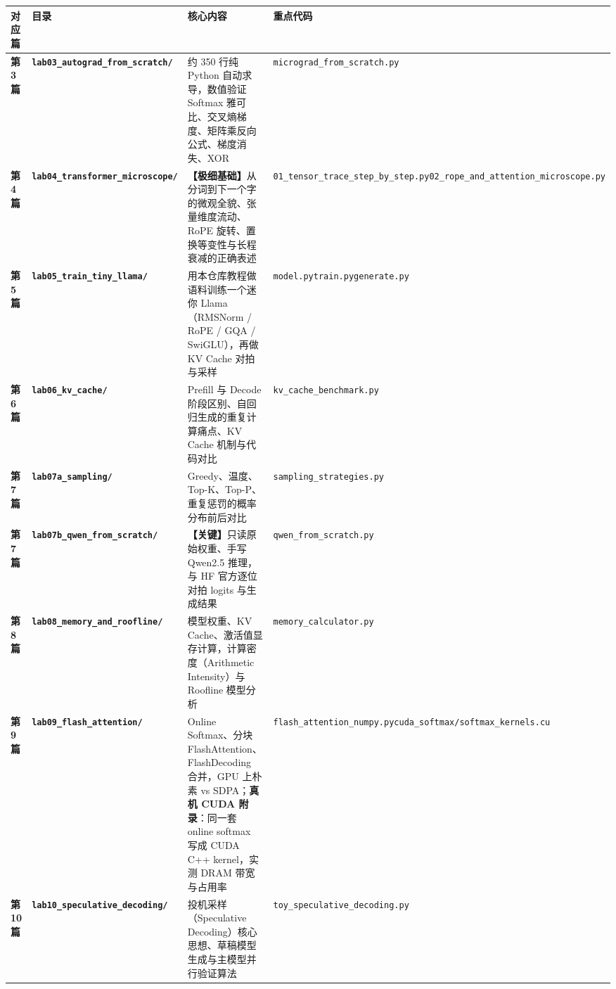 \begin{center}
\small
\begin{tabularx}{\textwidth}{p{2.5cm} p{3.5cm} X X}
\toprule
\textbf{对应篇} & \textbf{目录} & \textbf{核心内容} & \textbf{重点代码} \\
\midrule
\textbf{第 3 篇} & {}\textbf{\texttt{lab03\_autograd\_from\_scratch/}} & 约 350 行纯 Python 自动求导，数值验证 Softmax 雅可比、交叉熵梯度、矩阵乘反向公式、梯度消失、XOR & \texttt{micrograd\_from\_scratch.py} \\
\textbf{第 4 篇} & {}\textbf{\texttt{lab04\_transformer\_microscope/}} & \textbf{【极细基础】}从分词到下一个字的微观全貌、张量维度流动、RoPE 旋转、置换等变性与长程衰减的正确表述 & \texttt{01\_tensor\_trace\_step\_by\_step.py}\newline \texttt{02\_rope\_and\_attention\_microscope.py} \\
\textbf{第 5 篇} & {}\textbf{\texttt{lab05\_train\_tiny\_llama/}} & 用本仓库教程做语料训练一个迷你 Llama（RMSNorm / RoPE / GQA / SwiGLU），再做 KV Cache 对拍与采样 & \texttt{model.py}\newline \texttt{train.py}\newline \texttt{generate.py} \\
\textbf{第 6 篇} & {}\textbf{\texttt{lab06\_kv\_cache/}} & Prefill 与 Decode 阶段区别、自回归生成的重复计算痛点、KV Cache 机制与代码对比 & \texttt{kv\_cache\_benchmark.py} \\
\textbf{第 7 篇} & {}\textbf{\texttt{lab07a\_sampling/}} & Greedy、温度、Top-K、Top-P、重复惩罚的概率分布前后对比 & \texttt{sampling\_strategies.py} \\
\textbf{第 7 篇} & {}\textbf{\texttt{lab07b\_qwen\_from\_scratch/}} & \textbf{【关键】}只读原始权重、手写 Qwen2.5 推理，与 HF 官方逐位对拍 logits 与生成结果 & \texttt{qwen\_from\_scratch.py} \\
\textbf{第 8 篇} & {}\textbf{\texttt{lab08\_memory\_and\_roofline/}} & 模型权重、KV Cache、激活值显存计算，计算密度（Arithmetic Intensity）与 Roofline 模型分析 & \texttt{memory\_calculator.py} \\
\textbf{第 9 篇} & {}\textbf{\texttt{lab09\_flash\_attention/}} & Online Softmax、分块 FlashAttention、FlashDecoding 合并，GPU 上朴素 vs SDPA；\textbf{\textbf{真机 CUDA 附录}}：同一套 online softmax 写成 CUDA C++ kernel，实测 DRAM 带宽与占用率 & \texttt{flash\_attention\_numpy.py}\newline \texttt{cuda\_softmax/softmax\_kernels.cu} \\
\textbf{第 10 篇} & {}\textbf{\texttt{lab10\_speculative\_decoding/}} & 投机采样（Speculative Decoding）核心思想、草稿模型生成与主模型并行验证算法 & \texttt{toy\_speculative\_decoding.py} \\

\end{tabularx}
\end{center}
